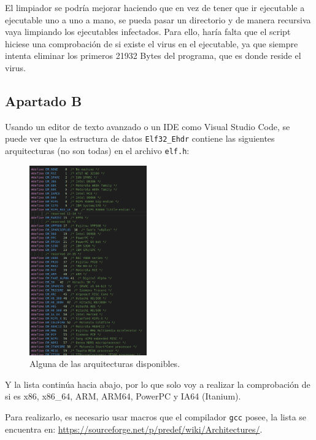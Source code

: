 \documentclass{article}
\begin{document}
El limpiador se podría mejorar haciendo que en vez de tener que ir ejecutable a ejecutable uno a uno a mano, se pueda pasar un directorio y de manera recursiva vaya limpiando los ejecutables infectados. Para ello, haría falta que el script hiciese una comprobación de si existe el virus en el ejecutable, ya que siempre intenta eliminar los primeros 21932 Bytes del programa, que es donde reside el virus.

{}
\subsection*{Apartado B}

Usando un editor de texto avanzado o un IDE como Visual Studio Code, se puede ver que la estructura de datos \verb|Elf32_Ehdr| contiene las siguientes arquitecturas (no son todas) en el archivo \verb|elf.h|:

\begin{figure}[H]
    \centering
    \includegraphics[width=0.45\textwidth]{imagenes/Captura desde 2022-11-23 13-07-09.png}
    \caption{Alguna de las arquitecturas disponibles.}
\end{figure}

Y la lista continúa hacia abajo, por lo que solo voy a realizar la comprobación de si es x86, x86\_64, ARM, ARM64, PowerPC y IA64 (Itanium). 

\newpage

Para realizarlo, es necesario usar macros que el compilador \verb|gcc| posee, la lista se encuentra en: \url{https://sourceforge.net/p/predef/wiki/Architectures/}.
\end{document}
